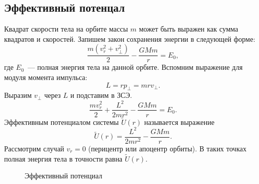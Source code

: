 \subsection{Эффективный потенцал}

Квадрат скорости тела на орбите массы $m$ может быть выражен как сумма квадратов  и  скоростей. Запишем закон сохранения энергии в следующей форме:
\begin{equation*}
	\frac{m(v^2_r + v^2_{\perp})}{2} - \frac{GMm}{r} = E_0,
\end{equation*}
где $E_0$~--- полная энергия тела на данной орбите. Вспомним выражение для модуля момента импульса:
\begin{equation}
	L = r p_{\perp} = mr v_{\perp}.
\end{equation}
Выразим $v_{\perp}$ через $L$ и подставим в ЗСЭ.
\begin{equation}
	\frac{m v^2_r}{2} + \frac{L^2}{2mr^2} - \frac{GMm}{r} = E_0.
\end{equation}
Эффективным потенциалом системы $\tilde{U}(r)$ называется выражение
\begin{equation}
	\tilde{U}(r) = \frac{L^2}{2mr^2} - \frac{GMm}{r}.
\end{equation}
Рассмотрим случай $v_r=0$ (перицентр или апоцентр орбиты). В таких точках полная энергия тела в точности равна $\tilde{U}(r)$.

\begin{wrapfigure}[7]{r}{0.3\tw}
    \centering
    \vspace{-1pc}
    \caption{Эффективный потенциал}
    \label{pic:effitient-potential-plot}
\end{wrapfigure} 

